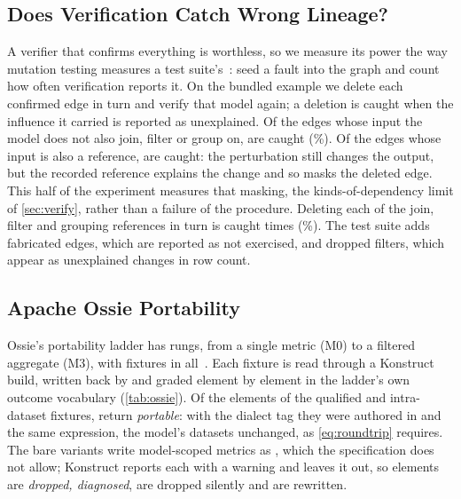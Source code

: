 \subsection{Does Verification Catch Wrong Lineage?}
\label{sec:eval-sensitivity}

A verifier that confirms everything is worthless, so we measure its power the way mutation
testing measures a test suite's~\citep{jia2011mutation}: seed a fault into the graph and count how
often verification reports it. On the bundled example we delete each confirmed edge in turn and
verify that model again; a deletion is caught when the influence it carried is reported as
unexplained. Of the \exDeletedEdges{} edges whose input the model does not also join, filter or
group on, \exDeletedEdgesCaught{} are caught (\exDeletedEdgesPct\%). Of the \exDeletedShared{}
edges whose input is also a reference, \exDeletedSharedCaught{} are caught: the perturbation still
changes the output, but the recorded reference explains the change and so masks the deleted
edge. This half of the experiment measures that masking, the kinds-of-dependency limit of
\cref{sec:verify}, rather than a failure of the procedure. Deleting each of the \exDeletedReferences{} join,
filter and grouping references in turn is caught \exDeletedReferencesCaught{} times
(\exDeletedReferencesPct\%). The test suite adds fabricated edges, which are reported as not
exercised, and dropped filters, which appear as unexplained changes in row count.

\subsection{Apache Ossie Portability}
\label{sec:eval-ossie}

Ossie's portability ladder has \ossieRungs{} rungs, from a single  metric (M0) to a
filtered aggregate (M3), with \ossieVariants{} fixtures in all~\citep{ossie}. Each fixture is read
through a Konstruct build, written back by  and graded element by
element in the ladder's own outcome vocabulary (\cref{tab:ossie}). Of the \ossieNamedElements{}
elements of the qualified and intra-dataset fixtures, \ossieNamedPortable{} return
\emph{portable}: with the dialect tag they were authored in and the same expression, the model's
datasets unchanged, as \cref{eq:roundtrip} requires. The bare variants write model-scoped metrics
as , which the specification does not allow; Konstruct reports each with a
warning and leaves it out, so \ossieDroppedDiagnosed{} elements are \emph{dropped, diagnosed},
\ossieDroppedSilent{} are dropped silently and \ossieRewritten{} are rewritten.

